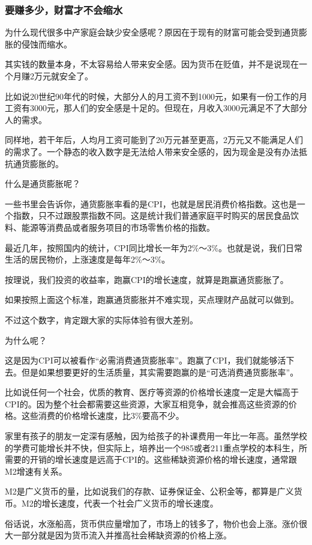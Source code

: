 \subsubsection{要赚多少，财富才不会缩水}

为什么现代很多中产家庭会缺少安全感呢？原因在于现有的财富可能会受到通货膨胀的侵蚀而缩水。

其实钱的数量本身，不太容易给人带来安全感。因为货币在贬值，并不是说现在一个月赚2万元就安全了。

比如说20世纪90年代的时候，大部分人的月工资不到1000元，如果有一份工作的月工资有3000元，那人们的安全感是十足的。但现在，月收入3000元满足不了大部分人的需求。

同样地，若干年后，人均月工资可能到了20万元甚至更高，2万元又不能满足人们的需求了。一个静态的收入数字是无法给人带来安全感的，因为现金是没有办法抵抗通货膨胀的。

什么是通货膨胀呢？

一些书里会告诉你，通货膨胀率看的是CPI，也就是居民消费价格指数。这也是一个指数，只不过跟股票指数不同。这是统计我们普通家庭平时购买的居民食品饮料、能源等消费品或者服务项目的市场零售价格的指数。

最近几年，按照国内的统计，CPI同比增长一年为2\%～3\%。也就是说，我们日常生活的居民物价，上涨速度是每年2\%～3\%。

按理说，我们投资的收益率，跑赢CPI的增长速度，就算是跑赢通货膨胀了。

如果按照上面这个标准，跑赢通货膨胀并不难实现，买点理财产品就可以做到。

不过这个数字，肯定跟大家的实际体验有很大差别。

为什么呢？

这是因为CPI可以被看作“必需消费通货膨胀率”。跑赢了CPI，我们就能够活下去。但是如果想要更好的生活质量，其实需要跑赢的是“可选消费通货膨胀率”。

比如说任何一个社会，优质的教育、医疗等资源的价格增长速度一定是大幅高于CPI的。因为整个社会都需要这些资源，大家互相竞争，就会推高这些资源的价格。这些消费的价格增长速度，比3\%要高不少。

家里有孩子的朋友一定深有感触，因为给孩子的补课费用一年比一年高。虽然学校的学费可能增长并不快，但实际上，培养出一个985或者211重点学校的本科生，所需要的开销的增长速度是远高于CPI的。这些稀缺资源价格的增长速度，通常跟M2增速有关系。

M2是广义货币的量，比如说我们的存款、证券保证金、公积金等，都算是广义货币。M2的增长速度，代表一个社会广义货币的增长速度。

俗话说，水涨船高，货币供应量增加了，市场上的钱多了，物价也会上涨。涨价很大一部分就是因为货币流入并推高社会稀缺资源的价格上涨。

